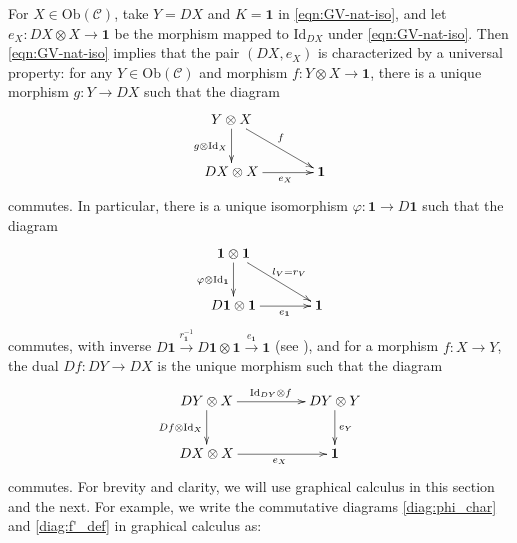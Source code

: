 \documentclass[11pt, reqno]{amsart}
\theoremstyle{definition}\newtheorem{defi}[thm]{Definition}
\theoremstyle{definition}\newtheorem{rem}[thm]{Remark}
\theoremstyle{definition}\newtheorem{exam}[thm]{Example}
\theoremstyle{definition}\newtheorem{assum}[thm]{Assumption}
\newcommand{\cC}{\mathcal{C}}
\newcommand{\Id}{\mathrm{Id}}
\newcommand{\tens}{\otimes}
\newcommand{\vac}{\mathbf{1}}
\begin{document}
For $X\in\mathrm{Ob}(\cC)$, take $Y=DX$ and $K=\vac$ in \eqref{eqn:GV-nat-iso}, and let $e_X: DX\otimes X\rightarrow\vac$ be the morphism mapped to $\Id_{DX}$ under \eqref{eqn:GV-nat-iso}. Then \eqref{eqn:GV-nat-iso} implies that the pair $(DX,e_X)$ is characterized by a universal property: for any $Y\in\mathrm{Ob}(\cC)$ and morphism $f: Y\otimes X\rightarrow\vac$, there is a unique morphism $g: Y\rightarrow DX$ such that the diagram
\begin{equation*}
\xymatrixcolsep{3pc}
 \xymatrix{
 Y\tens X \ar[rd]^{f} \ar[d]_{g\tens\Id_X} & \\
DX\tens X \ar[r]_(.6){e_X} & \vac \\
 }
\end{equation*}
commutes. In particular, there is a unique isomorphism $\varphi:\vac\rightarrow D\vac$ such that the diagram
 \begin{equation}\label{diag:phi_char}
   \xymatrixcolsep{3pc}
   \begin{matrix}
   \xymatrix{
   \vac\otimes \vac \ar[rd]^{l_V=r_V} \ar[d]_{\varphi\tens\Id_\vac} & \\
   D\vac\tens \vac \ar[r]_(.6){e_\vac} & \vac\\}
   \end{matrix}
  \end{equation}
commutes, with inverse $D\vac\xrightarrow{r_\vac^{-1}} D\vac\otimes\vac\xrightarrow{e_\vac}\vac$ (see \cite[Remark 1.1(iv)]{BD}), and for a morphism $f: X\rightarrow Y$, the dual $Df: DY\rightarrow DX$ is the unique morphism such that the diagram
\begin{equation}\label{diag:f'_def}
 \xymatrixcolsep{4pc}
 \begin{matrix}
 \xymatrix{
 DY\otimes X \ar[r]^{\Id_{DY}\otimes f} \ar[d]_{Df\otimes\Id_X} & DY\otimes Y \ar[d]^{e_{Y}} \\
 DX\otimes X \ar[r]_(.57){e_{X}} & \vac \\
 }
 \end{matrix}
\end{equation}
commutes. For brevity and clarity, we will use graphical calculus in this section and the next. For example, we write the commutative diagrams \eqref{diag:phi_char} and \eqref{diag:f'_def} in graphical calculus as:
\end{document}
